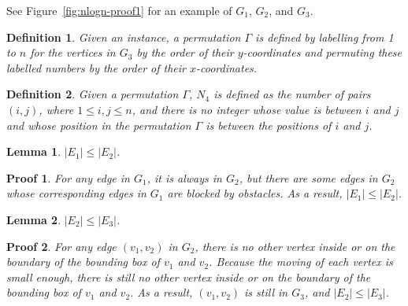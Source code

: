 \documentclass[]{article}
\newtheorem{Definition}{Definition}
\newtheorem{Lemma}{Lemma}
\newtheorem{Proof}{Proof}
\begin{document}
\begin{qunlist}
{{See Figure~\ref{fig:nlogn-proof1} for an example of $G_1$, $G_2$, and $G_3$.

\begin{Definition}\label{def:gamma}
Given an instance, a permutation $\Gamma$ is defined by labelling from 1 to $n$ for the vertices in $G_3$ by the order of their $y$-coordinates and permuting these labelled numbers by the order of their $x$-coordinates.
\end{Definition}

\begin{Definition}\label{def:n4}
Given a permutation $\Gamma$, $N_4$ is defined as the number of pairs $(i,j)$, where $1\leq i,j\leq n$, and there is no integer whose value is between $i$ and $j$ and whose position in the permutation $\Gamma$ is between the positions of $i$ and $j$.
\end{Definition}



\begin{Lemma}\label{lemma:e1-e2}
$|E_1|\leq |E_2|$.
\end{Lemma}

\begin{Proof}
For any edge in $G_1$, it is always in $G_2$, but there are some edges in $G_2$ whose corresponding edges in $G_1$ are blocked by obstacles. As a result, $|E_1|\leq |E_2|$.
\end{Proof}

\begin{Lemma}\label{lemma:e2-e3}
$|E_2|\leq |E_3|$.
\end{Lemma}

\begin{Proof}
For any edge $(v_1,v_2)$ in $G_2$, there is no other vertex inside or on the boundary of the bounding box of $v_1$ and $v_2$. Because the moving of each vertex is small enough, there is still no other vertex inside or on the boundary of the bounding box of $v_1$ and $v_2$. As a result, $(v_1,v_2)$ is still in $G_3$, and $|E_2|\leq |E_3|$.
\end{Proof}

}}
\end{qunlist}
\end{document}
